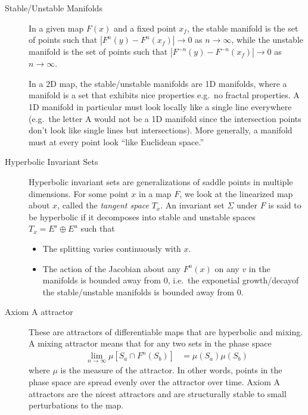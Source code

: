 \documentclass[12pt]{article}
\newcommand{\abs}[1]{\left|#1\right|}
\begin{document}
\begin{description}
    \item[Stable/Unstable Manifolds] In a given map $F(x)$ and a fixed point
        $x_f$, the stable manifold is the set of points such that $\abs{F^n(y) -
        F^n(x_f)} \to 0$ as $n \to \infty$, while the unstable manifold is the
        set of points such that $\abs{F^{-n}(y) - F^{-n}(x_f)} \to 0$ as $n \to
        \infty$.

        In a 2D map, the stable/unstable manifolds are 1D manifolds, where a
        manifold is a set that exhibits nice properties e.g.\ no fractal
        properties. A 1D manifold in particular must look locally like a single
        line everywhere (e.g.\ the letter A would not be a 1D manifold since the
        intersection points don't look like single lines but intersections).
        More generally, a manifold must at every point look ``like Euclidean
        space.''

    \item[Hyperbolic Invariant Sets] Hyperbolic invariant sets are
        generalizations of saddle points in multiple dimensions. For some point
        $x$ in a map $F$, we look at the linearized map about $x$, called the
        \emph{tangent space} $T_x$. An invariant set $\Sigma$ under $F$ is said
        to be hyperbolic if it decomposes into stable and unstable spaces $T_x =
        E^s \oplus E^u$ such that
        \begin{itemize}
            \item The splitting varies continuously with $x$.
            \item The action of the Jacobian about any $F^n(x)$ on any $v$ in
                the manifolds is bounded away from $0$, i.e.\ the exponetial
                growth/decayof the stable/unstable manifolds is bounded away
                from $0$.
        \end{itemize}

    \item[Axiom A attractor] These are attractors of differentiable maps that
        are hyperbolic and mixing. A mixing attractor means that for any two
        sets in the phase space
        \begin{align}
            \lim_{n \to \infty}\mu\left[ S_a \cap F^n(S_b) \right] &=
            \mu(S_a)\mu(S_b)
        \end{align}
        where $\mu$ is the measure of the attractor. In other words, points in
        the phase space are spread evenly over the attractor over time. Axiom A
        attractors are the nicest attractors and are structurally stable to
        small perturbations to the map.
\end{description}
\end{document}
